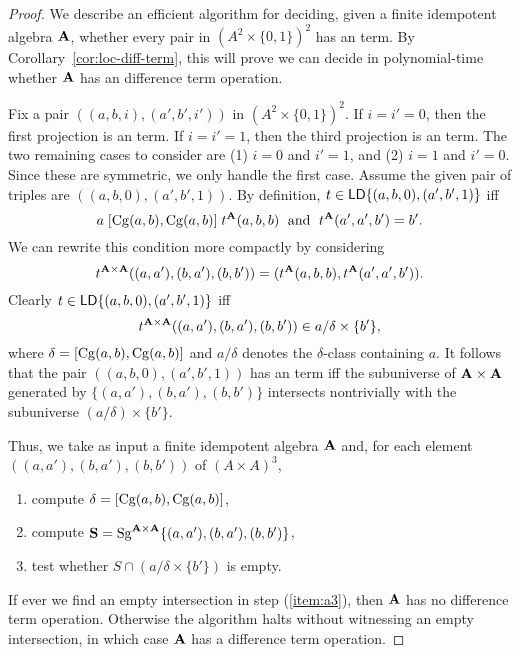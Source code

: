 \begin{proof}
  We describe an efficient algorithm for deciding,
  given a finite idempotent algebra $\mathbf{A} $,
  whether every pair in $(A^2 \times \{0,1\})^2$ 
  has an \ld term.  By Corollary~\ref{cor:loc-diff-term}, this will prove we
  can decide in polynomial-time whether $\mathbf{A} $ has an difference term operation.

  Fix a pair
  $((a,b,i), (a',b',i'))$ in $(A^2 \times \{0,1\})^2$. If $i = i' = 0$,
  then the first projection is an \ld term. If $i = i' = 1$,
    then the third projection is an \ld term. The two remaining cases to
    consider are (1) $i = 0$ and $i'=1$, and (2)
    $i = 1$ and $i'=0$. Since these are symmetric, we only handle the
    first case. Assume  the given pair of triples are
    $((a,b,0), (a',b',1))$.  By definition, 
    $t \in \mathsf{LD}\{(a,b,0), (a',b',1)\}$ iff
    \[
    a\mathrel{[\operatorname{Cg}(a,b), \operatorname{Cg}(a,b)]} t^{\mathbf{A} }(a,b,b) \; \text{ and } \;
    t^{\mathbf{A} }(a',a',b') = b'.
    \]
    We can rewrite this condition more compactly by
    considering
    \[t^{\mathbf{A} \times \mathbf{A} }((a,a'), (b,a'), (b,b')) =
    (t^{\mathbf{A} }(a,b,b),t^{\mathbf{A} }(a',a',b')).\]
    Clearly
    $t \in \mathsf{LD}\{(a,b,0), (a',b',1)\}$ iff
    \[
    t^{\mathbf{A} \times \mathbf{A} }((a,a'), (b,a'), (b,b'))\in a/\delta \times \{b'\},
    \]
    where $\delta = [\operatorname{Cg}(a,b), \operatorname{Cg}(a,b)]$ and $a/\delta$ denotes the
    $\delta$-class containing $a$.
    It follows that the pair
    $((a,b,0), (a',b',1))$ has an \ld term iff
    the subuniverse of $\mathbf{A} \times \mathbf{A} $ generated by
    $\{(a,a'), (b,a'), (b,b')\}$ intersects nontrivially with the subuniverse
    $(a/\delta) \times \{b'\}$.

    Thus, we take as input a finite idempotent algebra $\mathbf{A} $ and, 
    for each element $((a,a'), (b,a'), (b,b'))$ of $(A\times A)^3$,
    \begin{enumerate}
      \item compute $\delta = [\operatorname{Cg}(a,b), \operatorname{Cg}(a,b)]$, 
      \item compute $\mathbf{S} = \operatorname{Sg}^{\mathbf{A} \times \mathbf{A} }\{(a,a'), (b,a'), (b,b')\}$,
      \item \label{item:a3} test whether $S \cap (a/\delta \times \{b'\})$ is empty.
    \end{enumerate}
    If ever we find an empty intersection in step (\ref{item:a3}), then
    $\mathbf{A} $ has no difference term operation.
    Otherwise the algorithm halts without witnessing an empty
    intersection, in which case $\mathbf{A} $ has a difference term operation.


\end{proof}
